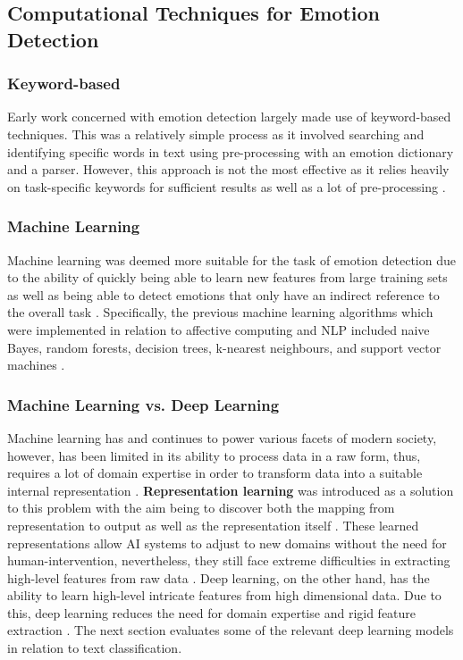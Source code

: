 \subsection{Computational Techniques for Emotion Detection}

\subsubsection{Keyword-based}

Early work concerned with emotion detection largely made use of keyword-based techniques. This was a relatively simple process as it involved searching and identifying specific words in text using pre-processing with an emotion dictionary and a parser. However, this approach is not the most effective as it relies heavily on task-specific keywords for sufficient results as well as a lot of pre-processing \citep{binali}. 

\subsubsection{Machine Learning}

Machine learning was deemed more suitable for the task of emotion detection due to the ability of quickly being able to learn new features from large training sets as well as being able to detect emotions that only have an indirect reference to the overall task \citep{binali} \citep{Jain2015ARO}. Specifically, the previous machine learning algorithms which were implemented in relation to affective computing and NLP included naive Bayes, random forests, decision trees, k-nearest neighbours, and support vector machines \citep{pdf:nlpsurvery} \citep{Jain2015ARO}. 

\subsubsection{Machine Learning vs. Deep Learning}

Machine learning has and continues to power various facets of modern society, however, has been limited in its ability to process data in a raw form, thus, requires a lot of domain expertise in order to transform data into a suitable internal representation \citep{LeCun}. \textbf{Representation learning} was introduced as a solution to this problem with the aim being to discover both the mapping from representation to output as well as the representation itself \citep{Goodfellow-et-al-2016}. These learned representations allow AI systems to adjust to new domains without the need for human-intervention, nevertheless, they still face extreme difficulties in extracting high-level features from raw data \citep{Goodfellow-et-al-2016}. Deep learning, on the other hand, has the ability to learn high-level intricate features from high dimensional data. Due to this, deep learning reduces the need for domain expertise and rigid feature extraction \citep{LeCun}. The next section evaluates some of the relevant deep learning models in relation to text classification. 

